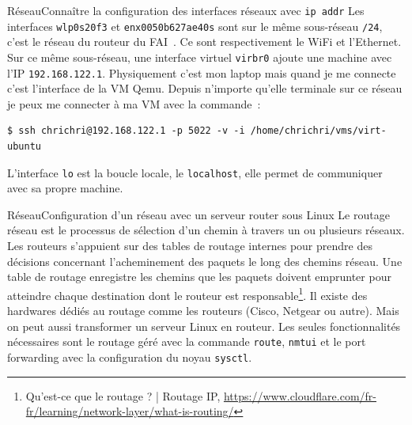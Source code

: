 \documentclass{beamer}
\begin{document}
    \begin{frame}[fragile]{Réseau}{Connaître la configuration des interfaces réseaux avec \lstinline{ip addr}}
        Les interfaces \lstinline{wlp0s20f3} et \lstinline{enx0050b627ae40s} sont sur le même sous-réseau \lstinline{/24}, c'est le réseau du routeur du FAI~.
        Ce sont respectivement le WiFi et l'Ethernet.
        \bigbreak
        Sur ce même sous-réseau, une interface virtuel \lstinline{virbr0} ajoute une machine avec l'IP \lstinline{192.168.122.1}.
        Physiquement c'est mon laptop mais quand je me connecte c'est l'interface de la VM Qemu.
        Depuis n'importe qu'elle terminale sur ce réseau je peux me connecter à ma VM avec la commande~:
        \begin{lstlisting}
$ ssh chrichri@192.168.122.1 -p 5022 -v -i /home/chrichri/vms/virt-ubuntu
        \end{lstlisting}
        \bigbreak
        L'interface \lstinline{lo} est la boucle locale, le \lstinline{localhost}, elle permet de communiquer avec sa propre machine.
    \end{frame}

    \begin{frame}{Réseau}{Configuration d'un réseau avec un serveur router sous Linux}
        Le routage réseau est le processus de sélection d'un chemin à travers un ou plusieurs réseaux.
        Les routeurs s'appuient sur des tables de routage internes pour prendre des décisions concernant l'acheminement des paquets le long des chemins réseau.
        Une table de routage enregistre les chemins que les paquets doivent emprunter pour atteindre chaque destination dont le routeur est responsable\footnote{Qu'est-ce que le routage ? | Routage IP, \url{https://www.cloudflare.com/fr-fr/learning/network-layer/what-is-routing/}}.
        Il existe des hardwares dédiés au routage comme les routeurs (Cisco, Netgear ou autre).
        \bigbreak
        Mais on peut aussi transformer un serveur Linux en routeur.
        Les seules fonctionnalités nécessaires sont le routage géré avec la commande \lstinline{route}, \lstinline{nmtui} et le port forwarding avec la configuration du noyau \lstinline{sysctl}.
    \end{frame}
\end{document}
